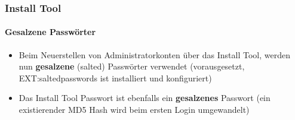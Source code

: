 \begin{frame}[fragile]
\end{frame}


\begin{frame}[fragile]
	\frametitle{Install Tool}
	\framesubtitle{Gesalzene Passwörter}

	\begin{itemize}
		\item Beim Neuerstellen von Administratorkonten über das Install Tool, werden nun \textbf{gesalzene} (salted) Passwörter verwendet\newline
			\smaller(vorausgesetzt, EXT:saltedpasswords ist installiert und konfiguriert)\normalsize
		\item Das Install Tool Passwort ist ebenfalls ein \textbf{gesalzenes} Passwort\newline
			\smaller(ein existierender MD5 Hash wird beim ersten Login umgewandelt)\normalsize
	\end{itemize}


\end{frame}
